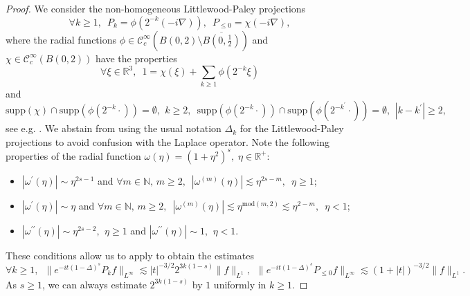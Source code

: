 \documentclass[12pt,a4paper]{amsart}
\numberwithin{equation}{section}
\begin{document}
	\begin{proof}
		We consider the non-homogeneous Littlewood-Paley projections
		\begin{equation*}
			\forall k \geq 1, \;\ P_k = \phi(2^{-k} (-i \nabla) ), \;\ P_{\leq 0} = \chi(-i \nabla) ,
		\end{equation*}
		where the radial functions $\phi \in \mathscr{C}^\infty_c(B(0,2) \setminus \overline{B(0,\frac12)}) $ and $\chi \in \mathscr{C}^\infty_c(B(0,2))$ have the properties
		\begin{equation}\label{eq:dyadic_decomp_1}
			\forall \xi \in \mathbb{R}^3 , \;\ 1 = \chi(\xi) + \sum_{k\geq1} \phi(2^{-k} \xi) 
		\end{equation}
		and
		\begin{equation}\label{eq:dyadic_decomp_2}
			\mathrm{supp} (\chi) \cap \mathrm{supp}(\phi(2^{-k} \cdot ) ) = \emptyset, \,\ k \geq 2, \;\  \mathrm{supp} (\phi(2^{-k} \cdot )) \cap \mathrm{supp}(\phi(2^{-k^\prime} \cdot ) ) = \emptyset, \,\ |k-k^\prime| \geq 2,
		\end{equation}
		see e.g. \cite[Section 2.2]{bahouri2011fourier}. We abstain from using the usual notation $\Delta_k$ for the Littlewood-Paley projections to avoid confusion with the Laplace operator.
		Note the following properties of the radial function $ \omega(\eta) = (1+\eta^2)^s ,\; \eta \in \mathbb{R}^+$:
		\begin{itemize}
			\item[] $ |\omega^\prime(\eta)| \sim \eta^{2s-1}$ and $ \forall m \in \mathbb{N}, \, m \geq 2, \;\ | \omega^{(m)}( \eta) | \lesssim \eta^{2s-m}, \;\ \eta \geq 1$;
			\item[] $ |\omega^\prime(\eta)| \sim \eta $ and $ \forall m \in \mathbb{N}, \, m \geq 2, \;\  | \omega^{(m)}( \eta ) | \lesssim \eta^{\mathrm{mod}(m,2)} \lesssim \eta^{2-m}, \;\ \eta < 1$;
			\item[] $ |\omega^{\prime\prime}(\eta)| \sim \eta^{2s-2}, \,\ \eta \geq 1$ and $ |\omega^{\prime\prime}(\eta)| \sim 1, \,\ \eta < 1$.
		\end{itemize}
		These conditions allow us to apply \cite[Theorem 1 and Remark 2]{GUO20081642} to obtain the estimates 
		\begin{equation*}
			\forall k \geq1, \;\ \| e^{-it(1-\Delta)^s} P_k f \|_{L^\infty} \lesssim |t|^{-3/2} 2^{3k(1-s)} \| f \|_{L^1}, \;\
			\| e^{-it(1-\Delta)^s} P_{\leq0} f \|_{L^\infty} \lesssim (1+|t|)^{-3/2} \| f \|_{L^1} . 
		\end{equation*}
		As $s \geq 1$, we can always estimate $ 2^{3k(1-s)}$ by $1$ uniformly in $k \geq 1$. 

\end{proof}
\end{document}
